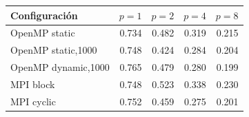 \begin{tabular}{lrrrr}
\toprule
Configuraci\'on & $p=1$ & $p=2$ & $p=4$ & $p=8$ \\
\midrule
OpenMP static & 0.734 & 0.482 & 0.319 & 0.215 \\
OpenMP static,1000 & 0.748 & 0.424 & 0.284 & 0.204 \\
OpenMP dynamic,1000 & 0.765 & 0.479 & 0.280 & 0.199 \\
MPI block & 0.748 & 0.523 & 0.338 & 0.230 \\
MPI cyclic & 0.752 & 0.459 & 0.275 & 0.201 \\
\bottomrule
\end{tabular}